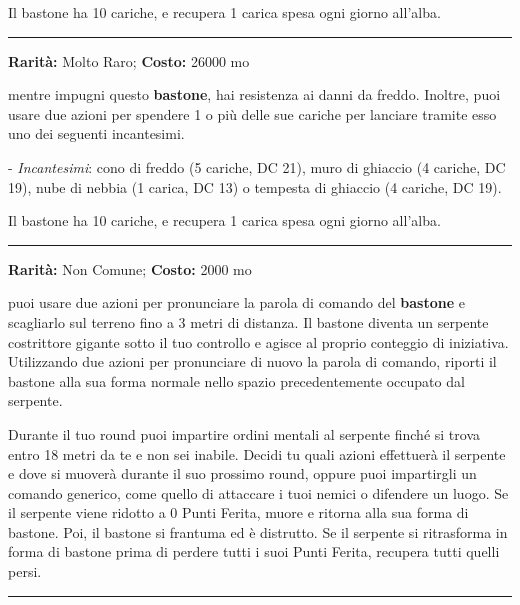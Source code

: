 \begin{multicols}{2}
Il bastone ha 10 cariche, e recupera 1 carica spesa ogni giorno all'alba.

\smallskip\noindent\rule{\linewidth}{2pt}  \hypertarget{BastonedelGelo}{}\medskip{}\noindent\label{BastonedelGelo}

\textbf{Rarità:} Molto Raro; \textbf{Costo:} 26000 mo

mentre impugni questo \textbf{bastone}, hai resistenza ai danni da freddo.
Inoltre, puoi usare due azioni per spendere 1 o più delle sue cariche per lanciare tramite esso uno dei seguenti incantesimi.

- \emph{Incantesimi}: cono di freddo (5 cariche, DC 21), muro di ghiaccio (4 cariche, DC 19), nube di nebbia (1 carica, DC 13) o tempesta di ghiaccio (4 cariche, DC 19).

Il bastone ha 10 cariche, e recupera 1 carica spesa ogni giorno all'alba.

\smallskip\noindent\rule{\linewidth}{2pt}  \hypertarget{BastonedelPitone}{}\medskip{}\noindent\label{BastonedelPitone}

\textbf{Rarità:} Non Comune; \textbf{Costo:} 2000 mo

puoi usare due azioni per pronunciare la parola di comando del \textbf{bastone} e scagliarlo sul terreno fino a 3 metri di distanza. Il bastone diventa un serpente costrittore gigante sotto il tuo controllo e agisce al proprio conteggio di iniziativa. Utilizzando due azioni per pronunciare di nuovo la parola di comando, riporti il bastone alla sua forma normale nello spazio precedentemente occupato dal serpente.

Durante il tuo round puoi impartire ordini mentali al serpente finché si trova entro 18 metri da te e non sei inabile. Decidi tu quali azioni effettuerà il serpente e dove si muoverà durante il suo prossimo round, oppure puoi impartirgli un comando generico, come quello di attaccare i tuoi nemici o difendere un luogo. Se il serpente viene ridotto a 0 Punti Ferita, muore e ritorna alla sua forma di bastone. Poi, il bastone si frantuma ed è distrutto. Se il serpente si ritrasforma in forma di bastone prima di perdere tutti i suoi Punti Ferita, recupera tutti quelli persi.

\smallskip\noindent\rule{\linewidth}{2pt}  \hypertarget{BastonedelPotere}{}\medskip{}\noindent\label{BastonedelPotere}


\end{multicols}
